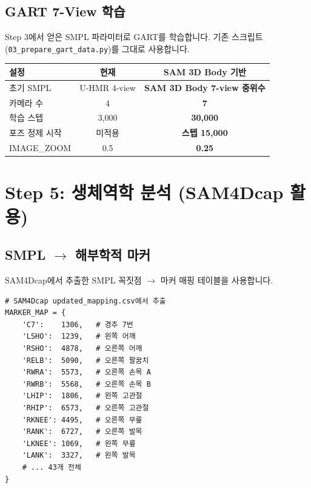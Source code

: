 \documentclass[11pt, a4paper]{report}
\begin{document}
\section{GART 7-View 학습}

Step 3에서 얻은 SMPL 파라미터로 GART를 학습합니다. 기존 스크립트 (\texttt{03\_prepare\_gart\_data.py})를 그대로 사용합니다.

\begin{center}
\renewcommand{\arraystretch}{1.2}
\begin{tabular}{lcc}
\toprule
\textbf{설정} & \textbf{현재} & \textbf{SAM 3D Body 기반} \\
\midrule
초기 SMPL & U-HMR 4-view & \textbf{SAM 3D Body 7-view 중위수} \\
카메라 수 & 4 & \textbf{7} \\
학습 스텝 & 3,000 & \textbf{30,000} \\
포즈 정제 시작 & 미적용 & \textbf{스텝 15,000} \\
IMAGE\_ZOOM & 0.5 & \textbf{0.25} \\
\bottomrule
\end{tabular}
\end{center}


\chapter{Step 5: 생체역학 분석 (SAM4Dcap 활용)}

\section{SMPL $\to$ 해부학적 마커}

SAM4Dcap에서 추출한 SMPL 꼭짓점 $\to$ 마커 매핑 테이블을 사용합니다.

\begin{codebox}[title={핵심 마커 인덱스 (SMPL 6,890 꼭짓점 기준)}]
\begin{verbatim}
# SAM4Dcap updated_mapping.csv에서 추출
MARKER_MAP = {
    'C7':    1306,   # 경추 7번
    'LSHO':  1239,   # 왼쪽 어깨
    'RSHO':  4878,   # 오른쪽 어깨
    'RELB':  5090,   # 오른쪽 팔꿈치
    'RWRA':  5573,   # 오른쪽 손목 A
    'RWRB':  5568,   # 오른쪽 손목 B
    'LHIP':  1806,   # 왼쪽 고관절
    'RHIP':  6573,   # 오른쪽 고관절
    'RKNEE': 4495,   # 오른쪽 무릎
    'RANK':  6727,   # 오른쪽 발목
    'LKNEE': 1069,   # 왼쪽 무릎
    'LANK':  3327,   # 왼쪽 발목
    # ... 43개 전체
}
\end{verbatim}
\end{codebox}
\end{document}
